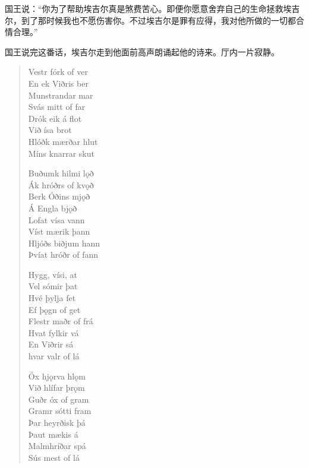 \begin{translation*}{}
    国王说：“你为了帮助埃吉尔真是煞费苦心。即便你愿意舍弃自己的生命拯救埃吉尔，到了那时候我也不愿伤害你。不过埃吉尔是罪有应得，我对他所做的一切都合情合理。”

    国王说完这番话，埃吉尔走到他面前高声朗诵起他的诗来。厅内一片寂静。
\end{translation*}

\begin{paracol}{2}
    \begin{quote}
        Vestr fórk of ver\\
        En ek Viðris ber\\
        Munstrandar mar\\
        Svás mitt of far\\
        Drók eik á flot\\
        Við ísa brot\\
        Hlóðk mærðar hlut\\
        Míns knarrar skut

        Buðumk hilmi lǫð\\
        Ák hróðrs of kvǫð\\
        Berk Óðins mjǫð\\
        Á Engla bjǫð\\
        Lofat vísa vann\\
        Víst mærik þann\\
        Hljóðs biðjum hann\\
        Þvíat hróðr of fann

        Hygg, vísi, at\\
        Vel sómir þat\\
        Hvé þylja fet\\
        Ef þǫgn of get\\
        Flestr maðr of frá \\
        Hvat fylkir vá\\
        En Viðrir sá \\
        hvar valr of lá

        Óx hjǫrva hlǫm\\
        Við hlífar þrǫm\\
        Guðr óx of gram\\
        Gramr sótti fram\\
        Þar heyrðisk þá\\
        Þaut mækis á\\
        Malmhríðar spá\\
        Sús mest of lá


\end{quote}
\end{paracol}
